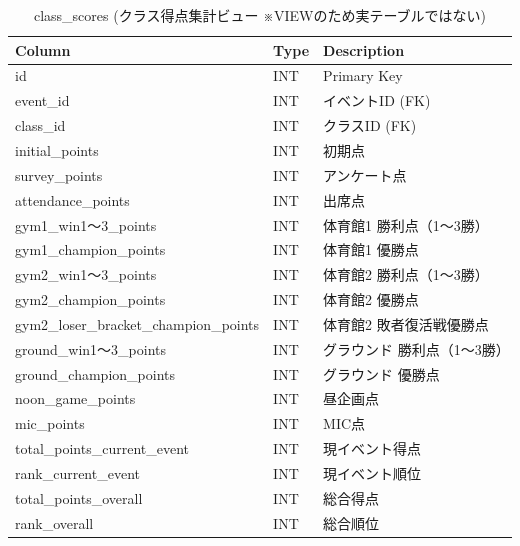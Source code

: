 \documentclass[paper=a4, fontsize=11pt]{jlreq}
\begin{document}
\begin{table}[H]
    \centering
    \caption{class\_scores (クラス得点集計ビュー ※VIEWのため実テーブルではない)}
    \begin{tabularx}{\textwidth}{|l|l|X|}
        \toprule
        Column & Type & Description \\
        \midrule
        id & INT & Primary Key \\
        event\_id & INT & イベントID (FK) \\
        class\_id & INT & クラスID (FK) \\
        initial\_points & INT & 初期点 \\
        survey\_points & INT & アンケート点 \\
        attendance\_points & INT & 出席点 \\
        gym1\_win1〜3\_points & INT & 体育館1 勝利点（1〜3勝） \\
        gym1\_champion\_points & INT & 体育館1 優勝点 \\
        gym2\_win1〜3\_points & INT & 体育館2 勝利点（1〜3勝） \\
        gym2\_champion\_points & INT & 体育館2 優勝点 \\
        gym2\_loser\_bracket\_champion\_points & INT & 体育館2 敗者復活戦優勝点 \\
        ground\_win1〜3\_points & INT & グラウンド 勝利点（1〜3勝） \\
        ground\_champion\_points & INT & グラウンド 優勝点 \\
        noon\_game\_points & INT & 昼企画点 \\
        mic\_points & INT & MIC点 \\
        total\_points\_current\_event & INT & 現イベント得点 \\
        rank\_current\_event & INT & 現イベント順位 \\
        total\_points\_overall & INT & 総合得点 \\
        rank\_overall & INT & 総合順位 \\
        \bottomrule
    \end{tabularx}
\end{table}
\end{document}
